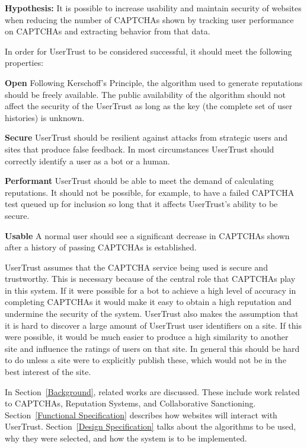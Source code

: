 \documentclass[journal, 12pt, onecolumn, draftclsnofoot]{IEEEtran}
\begin{document}
\textbf{Hypothesis:} It is possible to increase usability and maintain security of websites when reducing the number of CAPTCHAs shown by tracking user performance on CAPTCHAs and extracting behavior from that data.

In order for UserTrust to be considered successful, it should meet the following properties:
\begin{description}
  \item \textbf{Open} Following Kerschoff's Principle, the algorithm used to generate reputations should be freely available. The public availability of the algorithm should not affect the security of the UserTrust as long as the key (the complete set of user histories) is unknown.
  \item \textbf{Secure} UserTrust should be resilient against attacks from strategic users and sites that produce false feedback. In most circumstances UserTrust should correctly identify a user as a bot or a human.
  \item \textbf{Performant} UserTrust should be able to meet the demand of calculating reputations. It should not be possible, for example, to have a failed CAPTCHA test queued up for inclusion so long that it affects UserTrust's ability to be secure.
  \item \textbf{Usable} A normal user should see a significant decrease in CAPTCHAs shown after a history of passing CAPTCHAs is established.
\end{description}

UserTrust assumes that the CAPTCHA service being used is secure and trustworthy. This is necessary because of the central role that CAPTCHAs play in this system. If it were possible for a bot to achieve a high level of accuracy in completing CAPTCHAs it would make it easy to obtain a high reputation and undermine the security of the system. UserTrust also makes the assumption that it is hard to discover a large amount of UserTrust user identifiers on a site. If this were possible, it would be much easier to produce a high similarity to another site and influence the ratings of users on that site. In general this should be hard to do unless a site were to explicitly publish these, which would not be in the best interest of the site.

In Section~\ref{Background}, related works are discussed. These include work related to CAPTCHAs, Reputation Systems, and Collaborative Sanctioning. Section~\ref{Functional Specification} describes how websites will interact with UserTrust. Section~\ref{Design Specification} talks about the algorithms to be used, why they were selected, and how the system is to be implemented.
\end{document}
